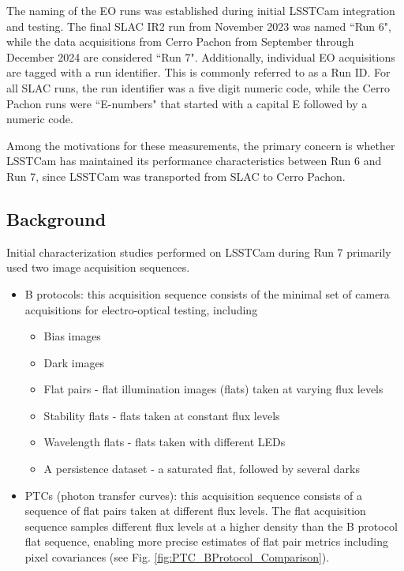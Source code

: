 The naming of the EO runs was established during initial LSSTCam
integration and testing. The final SLAC IR2 run from November 2023 was
named ``Run 6", while the data acquisitions from Cerro Pachon from September through December 2024 are
considered ``Run 7". Additionally, individual EO acquisitions are tagged
with a run identifier. This is commonly referred to as a Run ID. For all
SLAC runs, the run identifier was a five digit numeric code, while the
Cerro Pachon runs were ``E-numbers" that started with a capital E
followed by a numeric code.

Among the motivations for these measurements, the primary concern is whether LSSTCam has
maintained its performance characteristics between Run 6 and Run 7, since LSSTCam was transported from SLAC to Cerro Pachon.

\subsection{Background}\label{background}

Initial characterization studies performed on LSSTCam during Run 7 primarily used two
image acquisition sequences.

\begin{itemize}
\tightlist
\item
  B protocols: this acquisition sequence consists of the minimal set of
  camera acquisitions for electro-optical testing, including

  \begin{itemize}
  \tightlist
  \item
    Bias images
  \item
    Dark images
  \item
    Flat pairs - flat illumination images (flats) taken at varying flux levels
  \item
    Stability flats - flats taken at constant flux levels
  \item
    Wavelength flats - flats taken with different LEDs
  \item
    A persistence dataset - a saturated flat, followed by several darks
  \end{itemize}
\item
  PTCs (photon transfer curves): this acquisition sequence consists of a
  sequence of flat pairs taken at different flux levels. The flat
  acquisition sequence samples different flux levels at a higher density
  than the B protocol flat sequence, enabling more precise estimates of
  flat pair metrics including pixel covariances (see Fig. \ref{fig:PTC_BProtocol_Comparison}).
\end{itemize}

